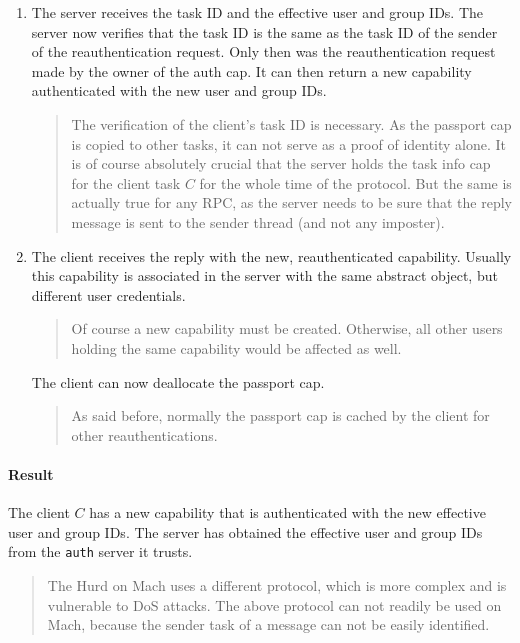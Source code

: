\documentclass[9pt,a4paper]{extarticle}
\newenvironment{comment}{\footnotesize \begin{quote}}{\end{quote}}
\begin{document}
\begin{enumerate}
\item The server receives the task ID and the effective user and group
  IDs.  The server now verifies that the task ID is the same as the
  task ID of the sender of the reauthentication request.  Only then
  was the reauthentication request made by the owner of the auth cap.
  It can then return a new capability authenticated with the new user
  and group IDs.

  \begin{comment}
    The verification of the client's task ID is necessary.  As the
    passport cap is copied to other tasks, it can not serve as a proof
    of identity alone.  It is of course absolutely crucial that the
    server holds the task info cap for the client task $C$ for the
    whole time of the protocol.  But the same is actually true for any
    RPC, as the server needs to be sure that the reply message is sent
    to the sender thread (and not any imposter).
  \end{comment}
  
\item The client receives the reply with the new, reauthenticated
  capability.  Usually this capability is associated in the server
  with the same abstract object, but different user credentials.

  \begin{comment}
    Of course a new capability must be created.  Otherwise, all other
    users holding the same capability would be affected as well.
  \end{comment}

  The client can now deallocate the passport cap.

  \begin{comment}
    As said before, normally the passport cap is cached by the client
    for other reauthentications.
  \end{comment}
\end{enumerate}

\paragraph{Result}
The client $C$ has a new capability that is authenticated with the new
effective user and group IDs.  The server has obtained the effective
user and group IDs from the \texttt{auth} server it trusts.

\begin{comment}
  The Hurd on Mach uses a different protocol, which is more complex
  and is vulnerable to DoS attacks.  The above protocol can not
  readily be used on Mach, because the sender task of a message can
  not be easily identified.
\end{comment}
\end{document}
